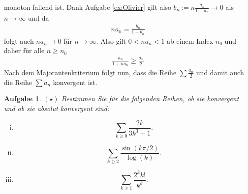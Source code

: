 \documentclass[a4paper, 20]{exam}
\newtheorem{ex}{Aufgabe}
\begin{document}
\begin{solution}
\begin{enumerate}[i)]
monoton fallend ist. Dank Aufgabe \ref{ex:Olivier} gilt also $b_n:= n \frac{a_n}{1+a_n} \to 0$ als $n \to \infty$ und da 
\begin{align*}
na_n = \frac{b_n}{1-b_n}
\end{align*}
folgt auch $na_n \to 0$ für $n \to \infty$. Also gilt $0 < na_n < 1$ ab einem Index $n_0$ und daher für alle $n \geq n_0$ 
\begin{align*}
\frac{a_n}{1+na_n} \geq \frac{a_n}{2}
\end{align*} 
Nach dem Majorantenkriterium folgt nun, dass die Reihe $\sum \frac{a_n}{2}$ und damit auch die Reihe $\sum a_n$ konvergent ist. 
\end{enumerate}
\end{solution}

\begin{ex}{$(\star)$}
Bestimmen Sie f\"ur die folgenden Reihen, ob sie konvergent und ob sie absolut konvergent sind:

\begin{enumerate}[i.)]
\item
$$\sum_{k\geq 0} \frac{2k}{3k^3+1}.$$

\item
$$\sum_{k\geq 2} \frac{\sin(k\pi/2)}{\log(k)}.$$

\item
$$\sum_{k\geq 1} \frac{2^k k!}{k^k}.$$

\end{enumerate}
\end{ex}
\end{document}
